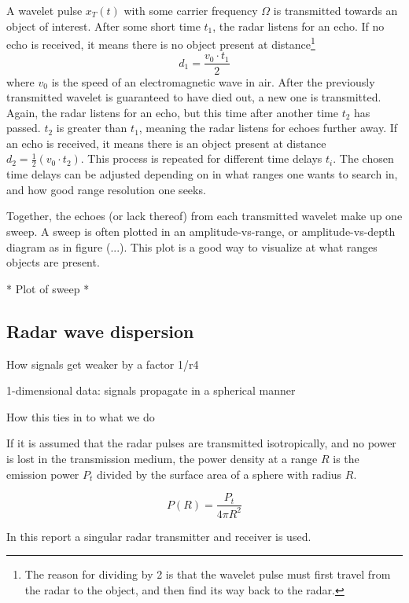 A wavelet pulse $x_T(t)$ with some carrier frequency $\Omega$  is transmitted towards an object of interest. After some short time $t_1$, the radar listens for an echo. If no echo is received, it means there is no object present at distance\footnote{The reason for dividing by 2 is that the wavelet pulse must first travel from the radar to the object, and then find its way back to the radar.}
\begin{equation}
	d_1 = \frac{v_0\cdot t_1}2
\end{equation}
where $v_0$ is the speed of an electromagnetic wave in air. After the previously transmitted wavelet is guaranteed to have died out, a new one is transmitted. Again, the radar listens for an echo, but this time after another time $t_2$ has passed. $t_2$ is greater than $t_1$, meaning the radar listens for echoes further away. If an echo is received, it means there is an object present at distance 
$
	d_2 = \frac12(v_0\cdot t_2).
$
This process is repeated for different time delays $t_i$. The chosen time delays can be adjusted depending on in what ranges one wants to search in, and how good range resolution one seeks.

Together, the echoes (or lack thereof) from each transmitted wavelet make up one sweep. A sweep is often plotted in an amplitude-vs-range, or amplitude-vs-depth diagram as in figure (...). This plot is a good way to visualize at what ranges objects are present.

* Plot of sweep *

\subsection{Radar wave dispersion}

How signals get weaker by a factor 1/r4

1-dimensional data: signals propagate in a spherical manner

How this ties in to what we do


If it is assumed that the radar pulses are transmitted isotropically, and no power is lost in the transmission medium, the power density at a range $R$ is the emission power $P_t$ divided by the surface area of a sphere with radius $R$.

\begin{equation}
	P(R) = \frac{P_t}{4\pi R^2}
\end{equation}


In this report a singular radar transmitter and receiver is used. 



